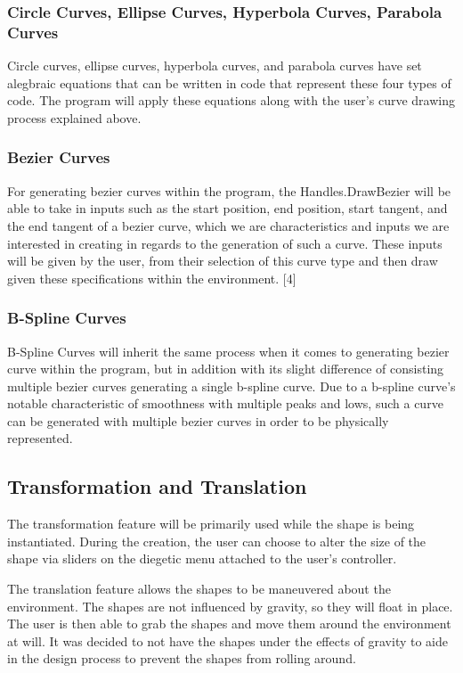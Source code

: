 \documentclass[draftclsnofoot,onecolumn,compsoc]{IEEEtran}
\begin{document}
\subsubsection{Circle Curves, Ellipse Curves, Hyperbola Curves, Parabola Curves}
	Circle curves, ellipse curves, hyperbola curves, and parabola curves have set alegbraic equations that can be written in code that represent these four types of code. The program will apply these equations along with the user’s curve drawing process explained above.
\subsubsection{Bezier Curves}
	For generating bezier curves within the program, the Handles.DrawBezier will be able to take in inputs such as the start position, end position, start tangent, and the end tangent of a bezier curve, which we are characteristics and inputs we are interested in creating in regards to the generation of such a curve. These inputs will be given by the user, from their selection of this curve type and then draw given these specifications within the environment. [4]
\subsubsection{B-Spline Curves}
	B-Spline Curves will inherit the same process when it comes to generating bezier curve within the program, but in addition with its slight difference of consisting multiple bezier curves generating a single b-spline curve. Due to a b-spline curve’s notable characteristic of smoothness with multiple peaks and lows, such a curve can be generated with multiple bezier curves in order to be physically represented.

\subsection{Transformation and Translation}
The transformation feature will be primarily used while the shape is being instantiated. During the creation, the user can choose to alter the size of the shape via sliders on the diegetic menu attached to the user’s controller. 

The translation feature allows the shapes to be maneuvered about the environment. The shapes are not influenced by gravity, so they will float in place. The user is then able to grab the shapes and move them around the environment at will. It was decided to not have the shapes under the effects of gravity to aide in the design process to prevent the shapes from rolling around.
\end{document}
